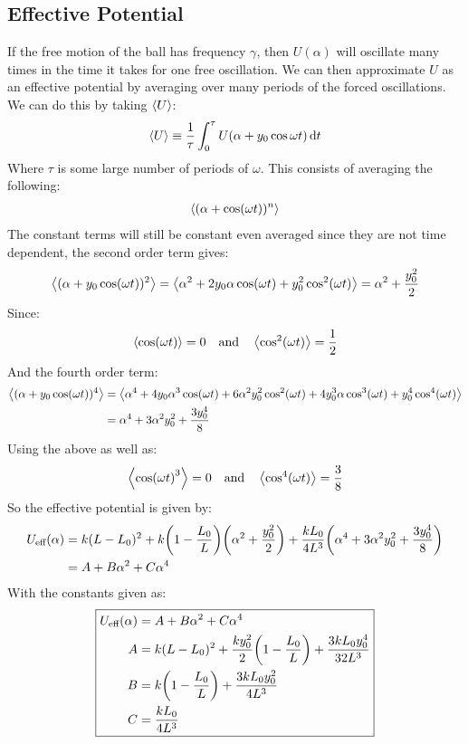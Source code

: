 \subsection{Effective Potential}
If the free motion of the ball has frequency $\gamma$, then $U(\alpha)$ will oscillate many times in the time it takes for one free oscillation. We can then approximate $U$ as an effective potential by averaging over many periods of the forced oscillations. We can do this by taking $\ev{U}$:
\begin{align*}
  \ev{U}\equiv\frac1\tau\int_0^\tau U(\alpha+y_0\cos\omega t)\dd{t}
\end{align*}
Where $\tau$ is some large number of periods of $\omega$. This consists of averaging the following:
\begin{align*}
  \ev{(\alpha+\cos(\omega t))^n}
\end{align*}
The constant terms will still be constant even averaged since they are not time dependent, the second order term gives:
\begin{align*}
  \ev{(\alpha+y_0\cos(\omega t))^2}=
  \ev{\alpha^2+2y_0\alpha\cos(\omega t)+y_0^2\cos^2(\omega t)}
  =\alpha^2+\frac{y_0^2}{2}
\end{align*}
Since:
\begin{align*}
  \ev{\cos(\omega t)}=0\quad\text{and}\quad\ev{\cos^2(\omega t)}=\frac12
\end{align*}
And the fourth order term:
\begin{align*}
  \ev{(\alpha+y_0\cos(\omega t))^4}&=
  \ev{\alpha^4+4y_0\alpha^3\cos(\omega t)+6\alpha^2y_0^2\cos^2(\omega t)
    +4y_0^3\alpha\cos^3(\omega t)+y_0^4\cos^4(\omega t)}\\
  &=\alpha^4+3\alpha^2y_0^2+\frac{3y_0^4}{8}
\end{align*}
Using the above as well as:
\begin{align*}
  \ev{\cos(\omega t)^3}=0\quad\text{and}\quad\ev{\cos^4(\omega t)}=\frac38
\end{align*}
So the effective potential is given by:
\begin{align*}
  U_{\text{eff}}(\alpha)&=k(L-L_0)^2
  +k\qty(1-\frac{L_0}{L})\qty(\alpha^2+\frac{y_0^2}{2})
  +\frac{kL_0}{4L^3}\qty(\alpha^4+3\alpha^2y_0^2+\frac{3y_0^4}{8})\\
  &=A+B\alpha^2+C\alpha^4
\end{align*}
With the constants given as:
\begin{equation}
  \boxed{\begin{aligned}
    U_{\text{eff}}(\alpha)&=A+B\alpha^2+C\alpha^4\\
    A&=k(L-L_0)^2+\frac{ky_0^2}2\qty(1-\frac{L_0}L)+\frac{3kL_0y_0^4}{32L^3}\\
    B&=k\qty(1-\frac{L_0}L)+\frac{3kL_0y_0^2}{4L^3}\\
    C&=\frac{kL_0}{4L^3}
  \end{aligned}}
\end{equation}
